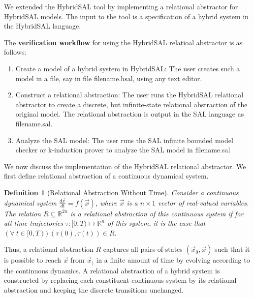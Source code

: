\documentclass{article}
\newtheorem{definition}{Definition}
\begin{document}
We extended the HybridSAL tool by implementing a 
relational abstractor for HybridSAL models.
The input to the tool is a specification of a hybrid system 
in the HybridSAL language.  

The {\bf{verification workflow}} for using the HybridSAL relatioal
abstractor is as follows:
\begin{enumerate}
\item  Create a model of a hybrid system in HybridSAL:
 The user creates such a model in a file, say in 
 file filename.hsal, using any text editor.
\item
 Construct a relational abstraction:
 The user runs the HybridSAL relational abstractor to create a discrete,
 but infinite-state relational abstraction of the original model.
 The relational abstraction is output in the SAL language as
 filename.sal.
\item
 Analyze the SAL model:
 The user runs the SAL infinite bounded model checker or k-induction prover
 to analyze the SAL model in filename.sal
\end{enumerate}

We now discuss the implementation of the HybridSAL relational abstractor.
We first define relational abstraction of a continuous dynamical
system. 

\begin{definition}[Relational Abstraction Without Time]\label{def-ra}
Consider a continuous dynamical system 
$\frac{d\vec{x}}{dt} = f(\vec{x})$, where $\vec{x}$ is a $n\times 1$
vector of real-valued variables.
The relation $R \subseteq \mathbb{R}^{2n}$ is a relational abstraction 
of this continuous system if  for all time
trajectories $\tau: [0,T) \mapsto \mathbb{R}^n$ of this system,
it is the case that
$ (\forall\ t \in [0,T))\ (\tau(0),\tau(t)) \in R$.
\end{definition}
Thus, a relational abstraction $R$
captures all pairs of states $(\vec{x}_0,\vec{x})$ such that it is possible to
reach $\vec{x}$ from $\vec{x}_)$ in a finite amount of time by evolving
according to the continuous dynamics.
A relational abstraction of a hybrid system is constructed by 
replacing each constituent continuous system by its relational 
abstraction and keeping the discrete transitions unchanged.
\end{document}
